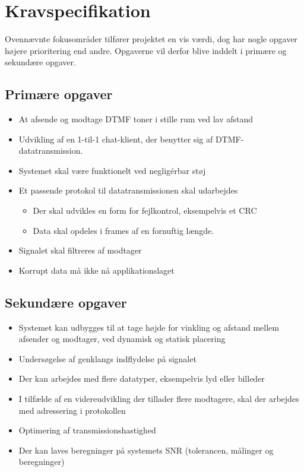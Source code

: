 \section{Kravspecifikation}

Ovennævnte fokusområder tilfører projektet en vis værdi, dog har nogle opgaver højere prioritering end andre. Opgaverne vil derfor blive inddelt i primære og sekundære opgaver.

\subsection{Primære opgaver}

\begin{itemize}[noitemsep]
  \item At afsende og modtage DTMF toner i stille rum ved lav afstand
  \item Udvikling af en 1-til-1 chat-klient, der benytter sig af DTMF-datatransmission.
  \item Systemet skal være funktionelt ved negligérbar støj
  \item Et passende protokol til datatransmissionen skal udarbejdes
  \begin{itemize}[noitemsep]
    \item Der skal udvikles en form for fejlkontrol, eksempelvis et CRC
    \item Data skal opdeles i frames af en fornuftig længde.
  \end{itemize}
  \item Signalet skal filtreres af modtager
  \item Korrupt data må ikke nå applikationslaget
\end{itemize}

\subsection{Sekundære opgaver}

\begin{itemize}[noitemsep]
\item Systemet kan udbygges til at tage højde for vinkling og afstand mellem afsender og modtager, ved dynamisk og statisk placering
\item Undersøgelse af genklangs indflydelse på signalet
\item Der kan arbejdes med flere datatyper, eksempelvis lyd eller billeder
\item I tilfælde af en videreudvikling der tillader flere modtagere, skal der arbejdes med adressering i protokollen
\item Optimering af transmissionshastighed
\item Der kan laves beregninger på systemets SNR (tolerancen, målinger og beregninger)
\end{itemize}